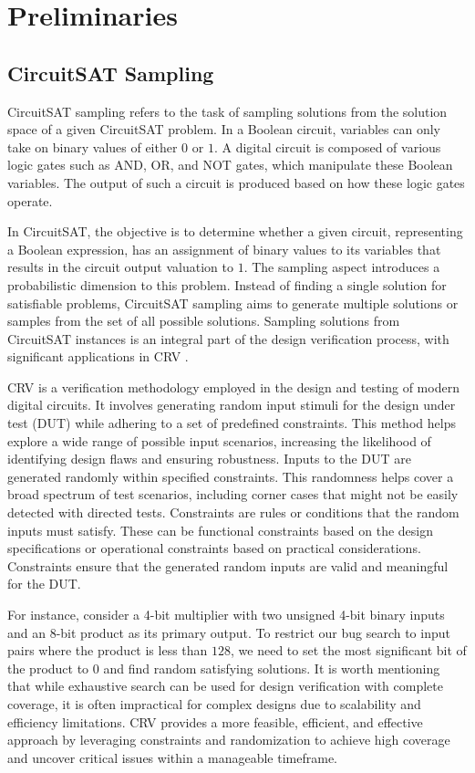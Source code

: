 \vspace{-0.25cm}
\section{Preliminaries}
\subsection{CircuitSAT Sampling} \label{subsec:circuitsat_sampling}
CircuitSAT sampling refers to the task of sampling solutions from the solution space of a given CircuitSAT problem. In a Boolean circuit, variables can only take on binary values of either $0$ or $1$. A digital circuit is composed of various logic gates such as AND, OR, and NOT gates, which manipulate these Boolean variables. The output of such a circuit is produced based on how these logic gates operate.


In CircuitSAT, the objective is to determine whether a given circuit, representing a Boolean expression, has an assignment of binary values to its variables that results in the circuit output valuation to $1$. The sampling aspect introduces a probabilistic dimension to this problem. Instead of finding a single solution for satisfiable problems, CircuitSAT sampling aims to generate multiple solutions or samples from the set of all possible solutions. Sampling solutions from CircuitSAT instances is an integral part of the design verification process, with significant applications in CRV \cite{Kitchen2007crv}.

CRV is a verification methodology employed in the design and testing of modern digital circuits. It involves generating random input stimuli for the design under test (DUT) while adhering to a set of predefined constraints. This method helps explore a wide range of possible input scenarios, increasing the likelihood of identifying design flaws and ensuring robustness. Inputs to the DUT are generated randomly within specified constraints. This randomness helps cover a broad spectrum of test scenarios, including corner cases that might not be easily detected with directed tests. Constraints are rules or conditions that the random inputs must satisfy. These can be functional constraints based on the design specifications or operational constraints based on practical considerations. Constraints ensure that the generated random inputs are valid and meaningful for the DUT.

For instance, consider a 4-bit multiplier with two unsigned 4-bit binary inputs and an 8-bit product as its primary output. To restrict our bug search to input pairs where the product is less than $128$, we need to set the most significant bit of the product to $0$ and find random satisfying solutions. It is worth mentioning that while exhaustive search can be used for design verification with complete coverage, it is often impractical for complex designs due to scalability and efficiency limitations. CRV provides a more feasible, efficient, and effective approach by leveraging constraints and randomization to achieve high coverage and uncover critical issues within a manageable timeframe.

